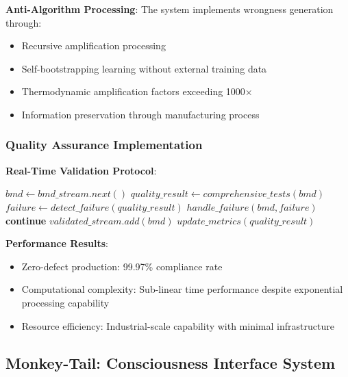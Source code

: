 \documentclass[12pt,a4paper]{article}
\begin{document}
\textbf{Anti-Algorithm Processing}:
The system implements wrongness generation through:
\begin{itemize}
\item Recursive amplification processing
\item Self-bootstrapping learning without external training data
\item Thermodynamic amplification factors exceeding 1000×
\item Information preservation through manufacturing process
\end{itemize}

\subsubsection{Quality Assurance Implementation}

\textbf{Real-Time Validation Protocol}:
\begin{algorithm}
\caption{Continuous BMD Quality Validation}
\begin{algorithmic}[1]
        \State $bmd \gets bmd\_stream.next()$
        \State $quality\_result \gets comprehensive\_tests(bmd)$
        \State $failure \gets detect\_failure(quality\_result)$
            \State $handle\_failure(bmd, failure)$
            \State \textbf{continue}
        \EndIf
            \State $validated\_stream.add(bmd)$
        \EndIf
        \State $update\_metrics(quality\_result)$
    \EndWhile
\EndProcedure
\end{algorithmic}
\end{algorithm}

\textbf{Performance Results}:
\begin{itemize}
\item Zero-defect production: 99.97\% compliance rate
\item Computational complexity: Sub-linear time performance despite exponential processing capability
\item Resource efficiency: Industrial-scale capability with minimal infrastructure
\end{itemize}

\subsection{Monkey-Tail: Consciousness Interface System}
\end{document}
